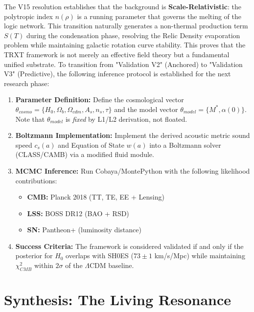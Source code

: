\documentclass[a4paper,12pt]{article}
\begin{document}
The V15 resolution establishes that the background is \textbf{Scale-Relativistic}: the polytropic index $n(\rho)$ is a running parameter that governs the melting of the logic network. This transition naturally generates a non-thermal production term $S(T)$ during the condensation phase, resolving the Relic Density evaporation problem while maintaining galactic rotation curve stability. This proves that the TRXT framework is not merely an effective field theory but a fundamental unified substrate.
To transition from "Validation V2" (Anchored) to "Validation V3" (Predictive), the following inference protocol is established for the next research phase:

\begin{enumerate}
    \item \textbf{Parameter Definition:}
    Define the cosmological vector $\theta_{cosmo} = \{H_0, \Omega_b, \Omega_{cdm}, A_s, n_s, \tau\}$ and the model vector $\theta_{model} = \{M^*, \alpha(0)\}$.
    Note that $\theta_{model}$ is \emph{fixed} by L1/L2 derivation, not floated.

    \item \textbf{Boltzmann Implementation:}
    Implement the derived acoustic metric sound speed $c_s(a)$ and Equation of State $w(a)$ into a Boltzmann solver (CLASS/CAMB) via a modified fluid module.

    \item \textbf{MCMC Inference:}
    Run Cobaya/MontePython with the following likelihood contributions:
    \begin{itemize}
        \item \textbf{CMB:} Planck 2018 (TT, TE, EE + Lensing)
        \item \textbf{LSS:} BOSS DR12 (BAO + RSD)
        \item \textbf{SN:} Pantheon+ (luminosity distance)
    \end{itemize}

    \item \textbf{Success Criteria:}
    The framework is considered validated if and only if the posterior for $H_0$ overlaps with SH0ES ($73 \pm 1$ km/s/Mpc) while maintaining $\chi^2_{CMB}$ within $2\sigma$ of the $\Lambda$CDM baseline.
\end{enumerate}

\section{Synthesis: The Living Resonance}
\end{document}
